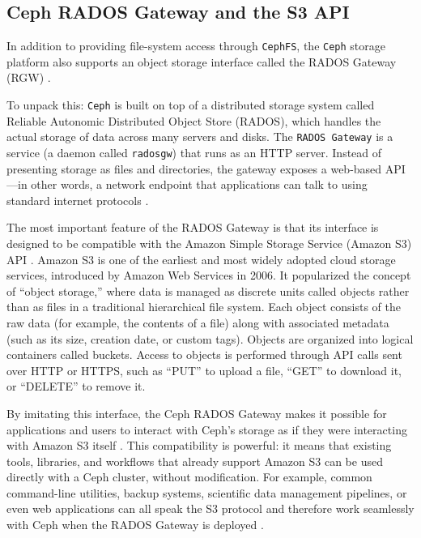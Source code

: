 \subsection{Ceph RADOS Gateway and the S3 API}

In addition to providing file-system access through \texttt{CephFS}, the 
\texttt{Ceph} storage platform also supports an object storage interface called 
the RADOS Gateway (RGW) \parencite{Ceph_RGW_Overview}.

\medskip

To unpack this: \texttt{Ceph} is built on top of a distributed storage system 
called Reliable Autonomic Distributed Object Store (RADOS), which handles the 
actual storage of data across many servers and disks. The \texttt{RADOS Gateway} 
is a service (a daemon called \texttt{radosgw}) that runs as an HTTP server. 
Instead of presenting storage as files and directories, the gateway exposes a 
web-based API—in other words, a network endpoint that applications can talk to 
using standard internet protocols \parencite{Ceph_RGW_Overview,Ceph_RGW_S3}.

\medskip

The most important feature of the RADOS Gateway is that its interface is 
designed to be compatible with the Amazon Simple Storage Service (Amazon S3) 
API \parencite{Ceph_RGW_S3}. Amazon S3 is one of the earliest and most widely 
adopted cloud storage services, introduced by Amazon Web Services in 2006. It 
popularized the concept of “object storage,” where data is managed as discrete 
units called objects rather than as files in a traditional hierarchical file 
system. Each object consists of the raw data (for example, the contents of a 
file) along with associated metadata (such as its size, creation date, or custom 
tags). Objects are organized into logical containers called buckets. Access to 
objects is performed through API calls sent over HTTP or HTTPS, such as “PUT” 
to upload a file, “GET” to download it, or “DELETE” to remove it.

\medskip

By imitating this interface, the Ceph RADOS Gateway makes it possible for 
applications and users to interact with Ceph’s storage as if they were 
interacting with Amazon S3 itself \parencite{Ceph_RGW_S3,Ceph_RGW_Overview}. This 
compatibility is powerful: it means that existing tools, libraries, and 
workflows that already support Amazon S3 can be used directly with a Ceph 
cluster, without modification. For example, common command-line utilities, 
backup systems, scientific data management pipelines, or even web applications 
can all speak the S3 protocol and therefore work seamlessly with Ceph when the 
RADOS Gateway is deployed \parencite{Ceph_RGW_S3}.

